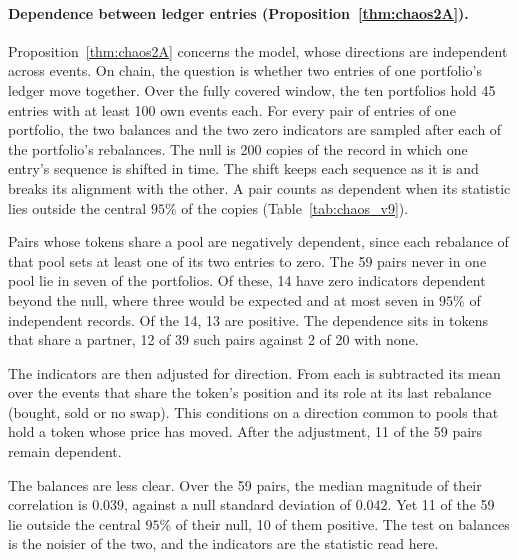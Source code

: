 \documentclass[11pt,a4paper]{article}
\theoremstyle{siphon}
\begin{document}
\paragraph{Dependence between ledger entries (Proposition~\ref{thm:chaos2A}).}
Proposition~\ref{thm:chaos2A} concerns the model, whose directions are independent across events. On chain, the question is whether two entries of one portfolio's ledger move together. Over the fully covered window, the ten portfolios hold 45 entries with at least 100 own events each. For every pair of entries of one portfolio, the two balances and the two zero indicators are sampled after each of the portfolio's rebalances. The null is 200 copies of the record in which one entry's sequence is shifted in time. The shift keeps each sequence as it is and breaks its alignment with the other. A pair counts as dependent when its statistic lies outside the central $95\%$ of the copies (Table~\ref{tab:chaos_v9}).

Pairs whose tokens share a pool are negatively dependent, since each rebalance of that pool sets at least one of its two entries to zero. The 59 pairs never in one pool lie in seven of the portfolios. Of these, 14 have zero indicators dependent beyond the null, where three would be expected and at most seven in $95\%$ of independent records. Of the 14, 13 are positive. The dependence sits in tokens that share a partner, 12 of 39 such pairs against 2 of 20 with none.

The indicators are then adjusted for direction. From each is subtracted its mean over the events that share the token's position and its role at its last rebalance (bought, sold or no swap). This conditions on a direction common to pools that hold a token whose price has moved. After the adjustment, 11 of the 59 pairs remain dependent.

The balances are less clear. Over the 59 pairs, the median magnitude of their correlation is $0.039$, against a null standard deviation of $0.042$. Yet 11 of the 59 lie outside the central $95\%$ of their null, 10 of them positive. The test on balances is the noisier of the two, and the indicators are the statistic read here.
\end{document}
